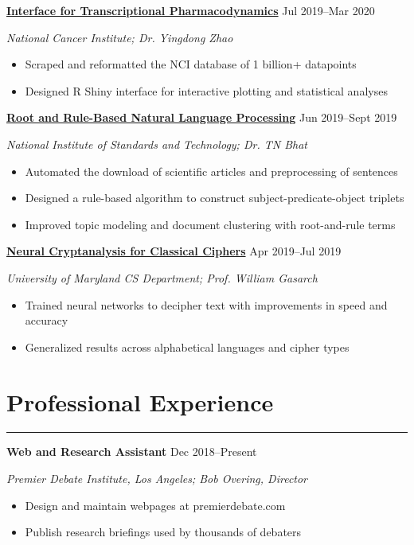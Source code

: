 \documentclass[11pt]{article}
\newcommand{\resumesection}[1]{\vspace{-0.3cm}\section*{\color{highlight}#1}\vspace{-0.3cm}\hrule\vspace{0.3cm}}
\begin{document}
\textbf{\href{https://github.com/petezh/TP-Workbench}{Interface for Transcriptional Pharmacodynamics}} \hfill Jul 2019--Mar 2020 \par
\textit{National Cancer Institute; Dr. Yingdong Zhao}
\begin{itemize}
	\item Scraped and reformatted the NCI database of 1 billion+ datapoints
	\item Designed R Shiny interface for interactive plotting and statistical analyses
\end{itemize}\vspace{0.1cm}

\textbf{\href{https://github.com/petezh/Root-and-Rule-NLP}{Root and Rule-Based Natural Language Processing}} \hfill Jun 2019--Sept 2019\par
\textit{National Institute of Standards and Technology; Dr. TN Bhat}
\begin{itemize}
	\item Automated the download of scientific articles and preprocessing of sentences
	\item Designed a rule-based algorithm to construct subject-predicate-object triplets
	\item Improved topic modeling and document clustering with root-and-rule terms
\end{itemize}\vspace{0.1cm}

\textbf{\href{https://github.com/petezh/Neural-Cryptanalysis}{Neural Cryptanalysis for Classical Ciphers}} \hfill Apr 2019--Jul 2019\par
\textit{University of Maryland CS Department; Prof. William Gasarch}
\begin{itemize}
	\item Trained neural networks to decipher text with improvements in speed and accuracy
	\item Generalized results across alphabetical languages and cipher types
\end{itemize}\vspace{0.1cm}


\resumesection{Professional Experience}

\textbf{Web and Research Assistant}   \hfill Dec 2018--Present \par
\textit{Premier Debate Institute, Los Angeles; Bob Overing, Director}
\begin{itemize}
	\item Design and maintain webpages at premierdebate.com
	\item Publish research briefings used by thousands of debaters
\end{itemize}
\end{document}
